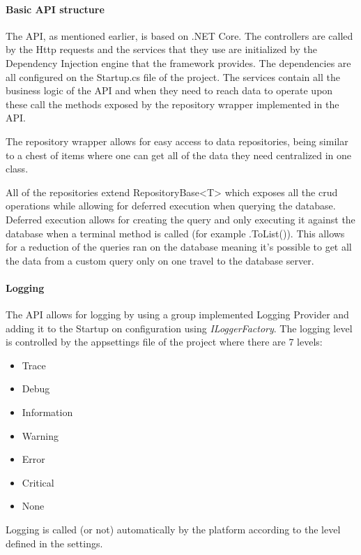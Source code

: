 \paragraph{Basic API structure}

The API, as mentioned earlier, is based on .NET Core. The controllers are called by the Http requests and the services that they use are initialized by the Dependency Injection engine that the framework provides. The dependencies are all configured on the Startup.cs file of the project.
The services contain all the business logic of the API and when they need to reach data to operate upon these call the methods exposed by the repository wrapper implemented in the API.

The repository wrapper allows for easy access to data repositories, being similar to a chest of items where one can get all of the data they need centralized in one class.

All of the repositories extend RepositoryBase<T> which exposes all the \gls{crud} operations while allowing for deferred execution when querying the database. Deferred execution allows for creating the query and only executing it against the database when a terminal method is called (for example .ToList()). This allows for a reduction of the queries ran on the database meaning it's possible to get all the data from a custom query only on one travel to the database server.


\paragraph{Logging}

The API allows for logging by using a group implemented Logging Provider and adding it to the Startup on configuration using \textit{ILoggerFactory}. The logging level is controlled by the appsettings file of the project where there are 7 levels:

\begin{itemize}
	\item Trace
	\item Debug
	\item Information
	\item Warning
	\item Error
	\item Critical
	\item None
\end{itemize}

Logging is called (or not) automatically by the platform according to the level defined in the settings.

